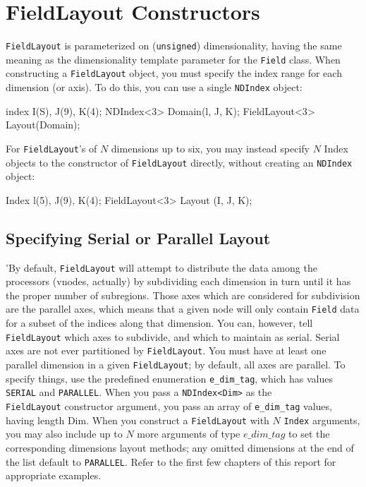 \section{FieldLayout Constructors}
 
\texttt{FieldLayout} is parameterized on (\texttt{unsigned}) dimensionality, having the same meaning as the dimensionality template parameter for the \texttt{Field} class. 
 When constructing a \texttt{FieldLayout} object, you must specify the index range for each dimension (or axis). To do this, you can 
	use a single \texttt{NDIndex} object:
  
\begin{smallcode}
index I(S), J(9), K(4); 
NDIndex<3> Domain(l, J, K);
FieldLayout<3> Layout(Domain);
\end{smallcode}
For \texttt{FieldLayout}'s of $N$ dimensions up to six, you may instead specify $N$ Index objects to the constructor of \texttt{FieldLayout} directly, without creating an \texttt{NDIndex} object: 
\begin{smallcode}
Index l(5), J(9), K(4);
FieldLayout<3> Layout (I, J, K); 
\end{smallcode}

\subsection{Specifying Serial or Parallel Layout}
'By default, \texttt{FieldLayout} will attempt to distribute the data among the processors (vnodes, actually) by subdividing each dimension in turn until it has the proper number of subregions. 
Those axes which are considered for subdivision are the parallel axes, which means that a given node will only contain \texttt{Field} data for a subset of the indices along that dimension. 
You can, however, tell \texttt{FieldLayout} which axes to subdivide, and which to maintain as serial. Serial axes are not ever partitioned by \texttt{FieldLayout}. 
You must have at least one parallel dimension in a given \texttt{FieldLayout}; by default, all axes are parallel. 
To specify things, use the predefined enumeration \texttt{e\_dim\_tag}, which has values \texttt{SERIAL} and \texttt{PARALLEL}. When you pass a \texttt{NDIndex<Dim>} as the\\ \texttt{FieldLayout} 
constructor argument, you pass an array of \texttt{e\_dim\_tag} values, having length Dim. When you construct a \texttt{FieldLayout} with $N$ \texttt{Index}  arguments, you may also include 
up to $N$ more arguments of type \texttt{$e\_dim\_tag$} to set the corresponding dimensions  layout methods; any omitted dimensions at the end of the list default to \texttt{PARALLEL}. 
Refer to the first few chapters of this report for appropriate examples. 

